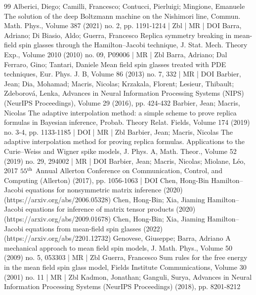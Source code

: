 \begin{thebibliography}{99}
Alberici, Diego; Camilli, Francesco; Contucci, Pierluigi; Mingione, Emanuele The solution of the deep Boltzmann machine on the Nishimori line, Commun. Math. Phys., Volume 387 (2021) no. 2, pp. 1191-1214 | Zbl | MR | DOI
Barra, Adriano; Di Biasio, Aldo; Guerra, Francesco Replica symmetry breaking in mean-field spin glasses through the Hamilton–Jacobi technique, J. Stat. Mech. Theory Exp., Volume 2010 (2010) no. 09, P09006 | MR | Zbl
Barra, Adriano; Dal Ferraro, Gino; Tantari, Daniele Mean field spin glasses treated with PDE techniques, Eur. Phys. J. B, Volume 86 (2013) no. 7, 332 | MR | DOI
Barbier, Jean; Dia, Mohamad; Macris, Nicolas; Krzakala, Florent; Lesieur, Thibault; Zdeborová, Lenka, Advances in Neural Information Processing Systems (NIPS) (NeurIPS Proceedings), Volume 29 (2016), pp. 424-432
Barbier, Jean; Macris, Nicolas The adaptive interpolation method: a simple scheme to prove replica formulas in Bayesian inference, Probab. Theory Relat. Fields, Volume 174 (2019) no. 3-4, pp. 1133-1185 | DOI | MR | Zbl
Barbier, Jean; Macris, Nicolas The adaptive interpolation method for proving replica formulas. Applications to the Curie–Weiss and Wigner spike models, J. Phys. A, Math. Theor., Volume 52 (2019) no. 29, 294002 | MR | DOI
Barbier, Jean; Macris, Nicolas; Miolane, Léo, 2017 $55^{\rm th}$ Annual Allerton Conference on Communication, Control, and Computing (Allerton) (2017), pp. 1056-1063 | DOI
Chen, Hong-Bin Hamilton–Jacobi equations for nonsymmetric matrix inference (2020) (https://arxiv.org/abs/2006.05328)
Chen, Hong-Bin; Xia, Jiaming Hamilton–Jacobi equations for inference of matrix tensor products (2020) (https://arxiv.org/abs/2009.01678)
Chen, Hong-Bin; Xia, Jiaming Hamilton–Jacobi equations from mean-field spin glasses (2022) (https://arxiv.org/abs/2201.12732)
Genovese, Giuseppe; Barra, Adriano A mechanical approach to mean field spin models, J. Math. Phys., Volume 50 (2009) no. 5, 053303 | MR | Zbl
Guerra, Francesco Sum rules for the free energy in the mean field spin glass model, Fields Institute Communications, Volume 30 (2001) no. 11 | MR | Zbl
Kadmon, Jonathan; Ganguli, Surya, Advances in Neural Information Processing Systems (NeurIPS Proceedings) (2018), pp. 8201-8212

\end{thebibliography}
